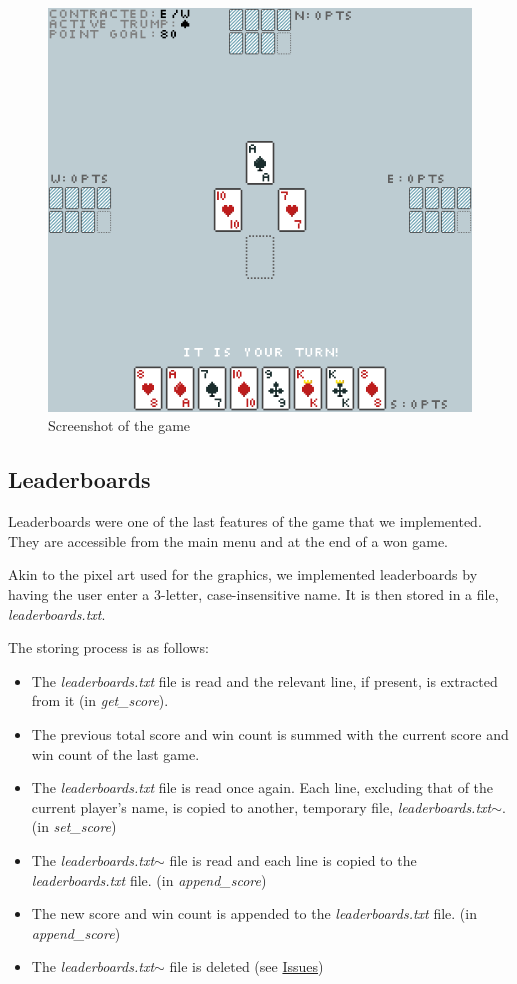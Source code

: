 \documentclass[12pt]{article}
\begin{document}
\begin{figure}[ht]
  \caption{Screenshot of the game}
  \includegraphics[width=1.0\textwidth]{game-screenshot}
\end{figure}

\subsection{Leaderboards}
\label{leaderboards}

Leaderboards were one of the last features of the game that we implemented.
They are accessible from the main menu and at the end of a won game.

Akin to the pixel art used for the graphics, we implemented leaderboards by having the user enter a 3-letter, case-insensitive name.
It is then stored in a file, \textit{leaderboards.txt}.

The storing process is as follows:

\begin{itemize}
\item The \textit{leaderboards.txt} file is read and the relevant line, if present, is extracted from it (in \textit{get\_score}).
\item The previous total score and win count is summed with the current score and win count of the last game.
\item The \textit{leaderboards.txt} file is read once again. Each line, excluding that of the current player's name, is copied to another, temporary file, \textit{leaderboards.txt$\sim$}. (in \textit{set\_score})
\item The \textit{leaderboards.txt$\sim$} file is read and each line is copied to the \textit{leaderboards.txt} file. (in \textit{append\_score})
\item The new score and win count is appended to the \textit{leaderboards.txt} file. (in \textit{append\_score})
\item The \textit{leaderboards.txt$\sim$} file is deleted (see \hyperref[issues]{Issues})
\end{itemize}
\end{document}
